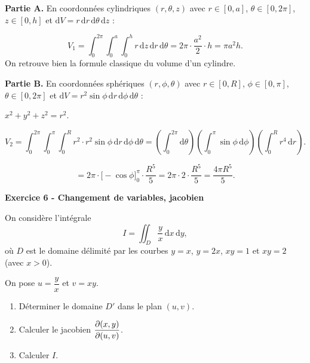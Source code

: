 \documentclass[12pt,a4paper]{article}
\begin{document}
\begin{boitecorrige}
\textbf{Partie A.} En coordonnées cylindriques $(r, \theta, z)$ avec $r \in [0,a]$, $\theta \in [0, 2\pi]$, $z \in [0, h]$ et $\mathrm{d}V = r\,\mathrm{d}r\,\mathrm{d}\theta\,\mathrm{d}z$ :

\[
V_1 = \int_0^{2\pi}\!\int_0^a\!\int_0^h r\,\mathrm{d}z\,\mathrm{d}r\,\mathrm{d}\theta
= 2\pi \cdot \frac{a^2}{2} \cdot h = \pi a^2 h.
\]
On retrouve bien la formule classique du volume d'un cylindre.

\textbf{Partie B.} En coordonnées sphériques $(r, \phi, \theta)$ avec $r \in [0,R]$, $\phi \in [0, \pi]$, $\theta \in [0, 2\pi]$ et $\mathrm{d}V = r^2\sin\phi\,\mathrm{d}r\,\mathrm{d}\phi\,\mathrm{d}\theta$ :

$x^2 + y^2 + z^2 = r^2$.

\[
V_2 = \int_0^{2\pi}\!\int_0^{\pi}\!\int_0^R r^2 \cdot r^2\sin\phi\,\mathrm{d}r\,\mathrm{d}\phi\,\mathrm{d}\theta
= \left(\int_0^{2\pi}\mathrm{d}\theta\right)\!\left(\int_0^{\pi}\sin\phi\,\mathrm{d}\phi\right)\!\left(\int_0^R r^4\,\mathrm{d}r\right).
\]

\[
= 2\pi \cdot \bigl[-\cos\phi\bigr]_0^{\pi} \cdot \frac{R^5}{5}
= 2\pi \cdot 2 \cdot \frac{R^5}{5} = \frac{4\pi R^5}{5}.
\]
\end{boitecorrige}

\begin{boiteexercice}
\textbf{Exercice 6 - Changement de variables, jacobien}\niveau{\difficile}

On considère l'intégrale
\[
I = \iint_D \frac{y}{x}\,\mathrm{d}x\,\mathrm{d}y,
\]
où $D$ est le domaine délimité par les courbes $y = x$, $y = 2x$, $xy = 1$ et $xy = 2$ (avec $x > 0$).

On pose $u = \dfrac{y}{x}$ et $v = xy$.

\begin{enumerate}
  \item Déterminer le domaine $D'$ dans le plan $(u,v)$.
  \item Calculer le jacobien $\dfrac{\partial (x,y)}{\partial (u,v)}$.
  \item Calculer $I$.
\end{enumerate}
\end{boiteexercice}
\end{document}
